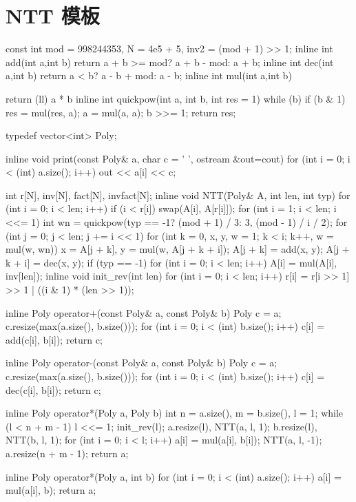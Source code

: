 \section{NTT 模板}

\begin{Cpp}
const int mod = 998244353, N = 4e5 + 5, inv2 = (mod + 1) >> 1;
inline int add(int a,int b) {return a + b >= mod? a + b - mod: a + b;}
inline int dec(int a,int b) {return a < b? a - b + mod: a - b;}
inline int mul(int a,int b) {return (ll) a * b %
inline int quickpow(int a, int b, int res = 1) {
  while (b) {
    if (b & 1) res = mul(res, a);
    a = mul(a, a);
    b >>= 1;
  }
  return res;
}

typedef vector<int> Poly;

inline void print(const Poly& a, char c = ' ', ostream &out=cout) {
  for (int i = 0; i < (int) a.size(); i++) out << a[i] << c;
}

int r[N], inv[N], fact[N], invfact[N];
inline void NTT(Poly& A, int len, int typ) {
  for (int i = 0; i < len; i++) if (i < r[i]) swap(A[i], A[r[i]]);
  for (int i = 1; i < len; i <<= 1) {
    int wn = quickpow(typ == -1? (mod + 1) / 3: 3, (mod - 1) / i / 2);
    for (int j = 0; j < len; j += i << 1) {
      for (int k = 0, x, y, w = 1; k < i; k++, w = mul(w, wn)) {
        x = A[j + k], y = mul(w, A[j + k + i]);
        A[j + k] = add(x, y);
        A[j + k + i] = dec(x, y);
      }
    }
  }
  if (typ == -1) for (int i = 0; i < len; i++) A[i] = mul(A[i], inv[len]);
}
inline void init_rev(int len) {
  for (int i = 0; i < len; i++) r[i] = r[i >> 1] >> 1 | ((i & 1) * (len >> 1));
}

inline Poly operator+(const Poly& a, const Poly& b) {
  Poly c = a; c.resize(max(a.size(), b.size()));
  for (int i = 0; i < (int) b.size(); i++) c[i] = add(c[i], b[i]);
  return c;
}

inline Poly operator-(const Poly& a, const Poly& b) {
  Poly c = a; c.resize(max(a.size(), b.size()));
  for (int i = 0; i < (int) b.size(); i++) c[i] = dec(c[i], b[i]);
  return c;
}

inline Poly operator*(Poly a, Poly b) {
  int n = a.size(), m = b.size(), l = 1;
  while (l < n + m - 1) l <<= 1;
  init_rev(l);
  a.resize(l), NTT(a, l, 1);
  b.resize(l), NTT(b, l, 1);
  for (int i = 0; i < l; i++) a[i] = mul(a[i], b[i]);
  NTT(a, l, -1);
  a.resize(n + m - 1);
  return a;
}

inline Poly operator*(Poly a, int b) {
  for (int i = 0; i < (int) a.size(); i++) a[i] = mul(a[i], b);
  return a;
}

}
\end{Cpp}
